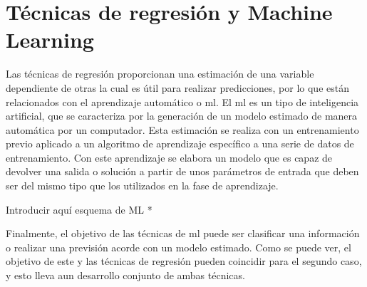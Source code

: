 \section{Técnicas de regresión y Machine Learning}
\par Las técnicas de regresión proporcionan una estimación de una variable dependiente de otras la cual es útil para realizar predicciones, por lo que están relacionados con el aprendizaje automático o \gls{ml}. El \gls{ml} es un tipo de inteligencia artificial, que se caracteriza por la generación de un modelo estimado de manera automática por un computador. Esta estimación se realiza con un entrenamiento previo aplicado a un algoritmo de aprendizaje específico a una serie de datos de entrenamiento. Con este aprendizaje se elabora un modelo que es capaz de devolver una salida o solución a partir de unos parámetros de entrada que deben ser del mismo tipo que los utilizados en la fase de aprendizaje. 
\\
\par * Introducir aquí esquema de ML *
\\
\par Finalmente, el objetivo de las técnicas de \gls{ml} puede ser clasificar una información o realizar una previsión acorde con un modelo estimado. Como se puede ver, el objetivo de este y las técnicas de regresión pueden coincidir para el segundo caso, y esto lleva aun desarrollo conjunto de ambas técnicas. 

